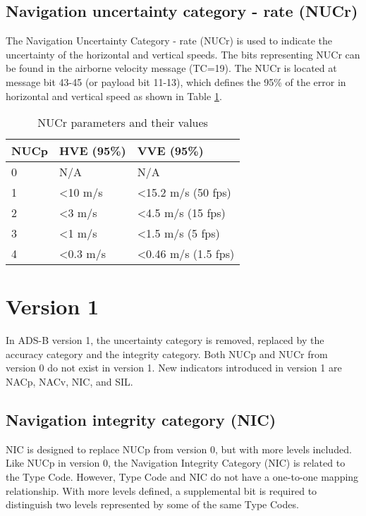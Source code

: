 \subsection{Navigation uncertainty category - rate (NUCr)}

The Navigation Uncertainty Category - rate (NUCr) is used to indicate the uncertainty of the horizontal and vertical speeds. The bits representing NUCr can be found in the airborne velocity message (TC=19). The NUCr is located at message bit 43-45 (or payload bit 11-13), which defines the 95\% of the error in horizontal and vertical speed as shown in Table \ref{tb:nucr-params}.

\begin{table}[ht]
\caption{NUCr parameters and their values}
\label{tb:nucr-params}
\begin{tabular}{|l|l|l|}
\hline
\textbf{NUCp} & \textbf{HVE (95\%)} & \textbf{VVE (95\%)} \\ \hline
0 & N/A & N/A \\ \hline
1 & \textless 10 m/s & \textless 15.2 m/s (50 fps) \\ \hline
2 & \textless 3 m/s & \textless 4.5 m/s (15 fps) \\ \hline
3 & \textless 1 m/s & \textless 1.5 m/s (5 fps) \\ \hline
4 & \textless 0.3 m/s & \textless 0.46 m/s (1.5 fps) \\ \hline
\end{tabular}
\end{table}



\section{Version 1}


In ADS-B version 1, the uncertainty category is removed, replaced by the accuracy category and the integrity category. Both NUCp and NUCr from version 0 do not exist in version 1. New indicators introduced in version 1 are NACp, NACv, NIC, and SIL.


\subsection{Navigation integrity category (NIC)}

NIC is designed to replace NUCp from version 0, but with more levels included. Like NUCp in version 0, the Navigation Integrity Category (NIC) is related to the Type Code. However, Type Code and NIC do not have a one-to-one mapping relationship. With more levels defined, a supplemental bit is required to distinguish two levels represented by some of the same Type Codes.

